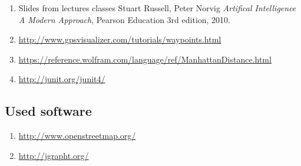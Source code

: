 \documentclass[a4paper]{article}
\begin{document}
\begin{enumerate}
	
	\item Slides from lectures classes
	Stuart Russell, Peter Norvig
	\emph{Artifical Intelligence A Modern Approach},
	Pearson Education
	3rd edition,
	2010.
	\item \url{http://www.gpsvisualizer.com/tutorials/waypoints.html} 
	\item \url{https://reference.wolfram.com/language/ref/ManhattanDistance.html}
	\item \url{http://junit.org/junit4/}
	

\end{enumerate}

\subsection{Used software} \label{openStreet}
\begin{enumerate}
	
\item \url{http://www.openstreetmap.org/}\label{itm:openStreet}
\item \url{http://jgrapht.org/}

\end{enumerate}

\newpage
\appendix

	
\end{document}
